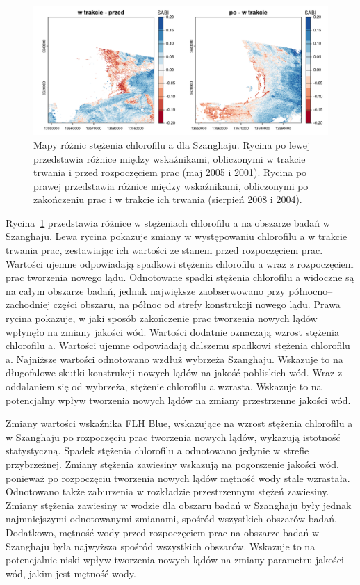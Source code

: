 \documentclass{amuthesis}
\begin{document}
\begin{figure}[t]

{\centering \includegraphics[width=6.25in,height=\textheight]{figures/china/sabi_diff.png}

}

\caption{\label{fig-cn_sabi_diff}Mapy różnic stężenia chlorofilu a dla
Szanghaju. Rycina po lewej przedstawia różnice między wskaźnikami,
obliczonymi w trakcie trwania i przed rozpoczęciem prac (maj 2005 i
2001). Rycina po prawej przedstawia różnice między wskaźnikami,
obliczonymi po zakończeniu prac i w trakcie ich trwania (sierpień 2008 i
2004).}

\end{figure}

Rycina~\ref{fig-cn_sabi_diff} przedstawia różnice w stężeniach
chlorofilu a na obszarze badań w Szanghaju. Lewa rycina pokazuje zmiany
w występowaniu chlorofilu a w trakcie trwania prac, zestawiając ich
wartości ze stanem przed rozpoczęciem prac. Wartości ujemne odpowiadają
spadkowi stężenia chlorofilu a wraz z rozpoczęciem prac tworzenia nowego
lądu. Odnotowane spadki stężenia chlorofilu a widoczne są na całym
obszarze badań, jednak największe zaobserwowano przy
północno--zachodniej części obszaru, na północ od strefy konstrukcji
nowego lądu. Prawa rycina pokazuje, w jaki sposób zakończenie prac
tworzenia nowych lądów wpłynęło na zmiany jakości wód. Wartości dodatnie
oznaczają wzrost stężenia chlorofilu a. Wartości ujemne odpowiadają
dalszemu spadkowi stężenia chlorofilu a. Najniższe wartości odnotowano
wzdłuż wybrzeża Szanghaju. Wskazuje to na długofalowe skutki konstrukcji
nowych lądów na jakość pobliskich wód. Wraz z oddalaniem się od
wybrzeża, stężenie chlorofilu a wzrasta. Wskazuje to na potencjalny
wpływ tworzenia nowych lądów na zmiany przestrzenne jakości wód.

Zmiany wartości wskaźnika FLH Blue, wskazujące na wzrost stężenia
chlorofilu a w Szanghaju po rozpoczęciu prac tworzenia nowych lądów,
wykazują istotność statystyczną. Spadek stężenia chlorofilu a odnotowano
jedynie w strefie przybrzeżnej. Zmiany stężenia zawiesiny wskazują na
pogorszenie jakości wód, ponieważ po rozpoczęciu tworzenia nowych lądów
mętność wody stale wzrastała. Odnotowano także zaburzenia w rozkładzie
przestrzennym stężeń zawiesiny. Zmiany stężenia zawiesiny w wodzie dla
obszaru badań w Szanghaju były jednak najmniejszymi odnotowanymi
zmianami, spośród wszystkich obszarów badań. Dodatkowo, mętność wody
przed rozpoczęciem prac na obszarze badań w Szanghaju była najwyższa
spośród wszystkich obszarów. Wskazuje to na potencjalnie niski wpływ
tworzenia nowych lądów na zmiany parametru jakości wód, jakim jest
mętność wody.
\end{document}
